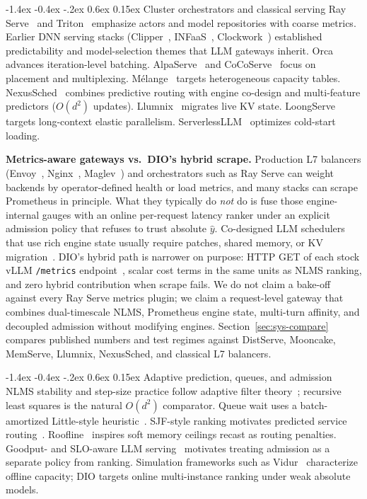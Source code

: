 \documentclass[pdflatex,sn-mathphys-num]{sn-jnl}
\makeatletter
\renewcommand{\subsection}{\@startsection{subsection}{2}{\z@}%
  {-1.4ex \@plus -0.4ex \@minus -.2ex}%
  {0.6ex \@plus 0.15ex}%
  {\needspace{3.5\baselineskip}\normalfont\normalsize\bfseries}}%
\makeatother
\begin{document}
\subsection{Cluster orchestrators and classical serving}
Ray Serve~\cite{rayserve} and Triton~\cite{triton} emphasize actors and model
repositories with coarse metrics. Earlier DNN serving stacks
(Clipper~\cite{clipper}, INFaaS~\cite{infaas}, Clockwork~\cite{clockwork})
established predictability and model-selection themes that LLM gateways inherit.
Orca~\cite{orca} advances iteration-level batching. AlpaServe~\cite{alpaserve} and
CoCoServe~\cite{CocoServe} focus on placement and multiplexing. M\'elange~\cite{melange}
targets heterogeneous capacity tables. NexusSched~\cite{nexussched} combines
predictive routing with engine co-design and multi-feature predictors ($O(d^2)$
updates). Llumnix~\cite{llumnix} migrates live KV state. LoongServe~\cite{loongserve}
targets long-context elastic parallelism. ServerlessLLM~\cite{serverlessllm}
optimizes cold-start loading.

\textbf{Metrics-aware gateways vs.\ DIO's hybrid scrape.}
Production L7 balancers (Envoy~\cite{envoy}, Nginx~\cite{nginx}, Maglev~\cite{maglev})
and orchestrators such as Ray Serve can weight backends by operator-defined health
or load metrics, and many stacks can scrape Prometheus in principle. What they
typically do \emph{not} do is fuse those engine-internal gauges with an online
per-request latency ranker under an explicit admission policy that refuses to trust
absolute $\hat{y}$. Co-designed LLM schedulers that use rich engine state usually
require patches, shared memory, or KV migration~\cite{nexussched,llumnix}. DIO's
hybrid path is narrower on purpose: HTTP GET of each stock vLLM \texttt{/metrics}
endpoint~\cite{prometheus,vllm}, scalar cost terms in the same units as NLMS
ranking, and zero hybrid contribution when scrape fails. We do not claim a bake-off
against every Ray Serve metrics plugin; we claim a request-level gateway that
combines dual-timescale NLMS, Prometheus engine state, multi-turn affinity, and
decoupled admission without modifying engines. Section~\ref{sec:sys-compare}
compares published numbers and test regimes against DistServe, Mooncake, MemServe,
Llumnix, NexusSched, and classical L7 balancers.

\subsection{Adaptive prediction, queues, and admission}
NLMS stability and step-size practice follow adaptive filter
theory~\cite{haykin2002adaptive,sayed2008adaptive}; recursive least squares is the
natural $O(d^2)$ comparator. Queue wait uses a batch-amortized Little-style
heuristic~\cite{littleslaw,kleinrock1975queueing}. SJF-style ranking motivates
predicted service routing~\cite{sjf}. Roofline~\cite{williams2009roofline} inspires
soft memory ceilings recast as routing penalties. Goodput- and SLO-aware LLM
serving~\cite{distserve,sloawarellm,sloaware2026} motivates treating admission as a
separate policy from ranking. Simulation frameworks such as Vidur~\cite{vidur}
characterize offline capacity; DIO targets online multi-instance ranking under weak
absolute models.
\end{document}
